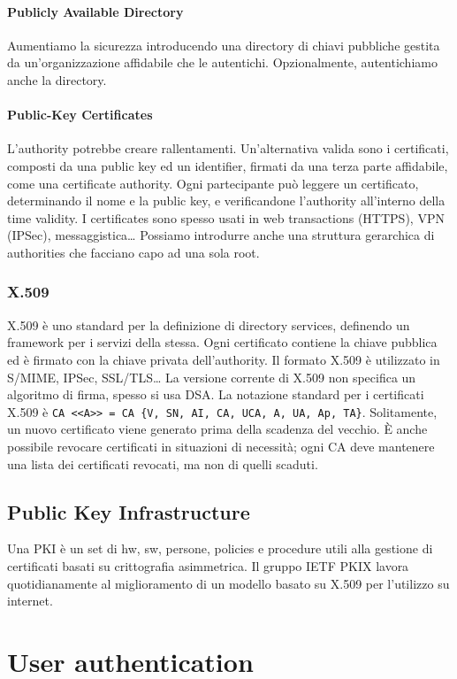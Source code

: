 \documentclass[11pt]{article}
\begin{document}
\paragraph{Publicly Available Directory} Aumentiamo la sicurezza introducendo una directory di chiavi pubbliche gestita da un'organizzazione affidabile che le autentichi. Opzionalmente, autentichiamo anche la directory. 
\paragraph{Public-Key Certificates} L'authority potrebbe creare rallentamenti. Un'alternativa valida sono i certificati, composti da una public key ed un identifier, firmati da una terza parte affidabile, come una certificate authority. Ogni partecipante può leggere un certificato, determinando il nome e la public key, e verificandone l'authority all'interno della time validity.
I certificates sono spesso usati in web transactions (HTTPS), VPN (IPSec), messaggistica\dots
Possiamo introdurre anche una struttura gerarchica di authorities che facciano capo ad una sola root. 
\subsubsection{X.509}
X.509 è uno standard per la definizione di directory services, definendo un framework per i servizi della stessa. Ogni certificato contiene la chiave pubblica ed è firmato con la chiave privata dell'authority. Il formato X.509 è utilizzato in S/MIME, IPSec, SSL/TLS\dots
La versione corrente di X.509 non specifica un algoritmo di firma, spesso si usa DSA. La notazione standard per i certificati X.509 è \verb|CA <<A>> = CA {V, SN, AI, CA, UCA, A, UA, Ap, TA}|. Solitamente, un nuovo certificato viene generato prima della scadenza del vecchio. È anche possibile revocare certificati in situazioni di necessità; ogni CA deve mantenere una lista dei certificati revocati, ma non di quelli scaduti. 
\subsection{Public Key Infrastructure}
Una PKI è un set di hw, sw, persone, policies e procedure utili alla gestione di certificati basati su crittografia asimmetrica. Il gruppo IETF PKIX lavora quotidianamente al miglioramento di un modello basato su X.509 per l'utilizzo su internet.

\section{User authentication}
\end{document}
